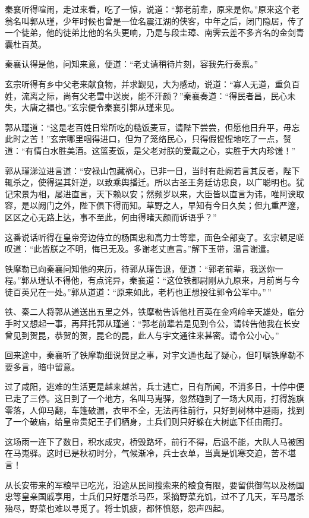 \documentclass[12pt,oneside]{book}
\begin{document}
秦襄听得喧闹，走过来看，吃了一惊，说道：``郭老前辈，原来是你。''原来这个老翁名叫郭从瑾，少年时候也曾是一位名震江湖的侠客，中年之后，闭门隐居，传了一个徒弟，他的徒弟比他的名头更响，乃是与段圭璋、南霁云差不多齐名的金剑青囊杜百英。

秦襄认得是他，问知来意，便道：``老丈请稍待片刻，容我先行奏禀。''

玄宗听得有乡中父老来献食物，并求觐见，大为感动，说道：``寡人无道，重负百姓，流离之际，尚有父老雪中送炭，能不汗颜？''秦襄奏道：``得民者昌，民心未失，大唐之福也。''玄宗便令秦襄引郭从瑾来见。

郭从瑾道：``这是老百姓日常所吃的糙饭麦豆，请陛下尝尝，但愿他日升平，毋忘此时之苦！''玄宗哪里咽得进口，但为了笼络民心，只得假惺惺地吃了一点，赞道：``有情白水胜美酒。这篮麦饭，是父老对朕的爱戴之心，实胜于大内珍馐！''

郭从瑾涕泣进言道：``安禄山包藏祸心，已非一日，当时有赴阙若言其反者，陛下辄杀之，使得逞其奸逆，以致乘舆播迁。所以古圣王务廷访忠良，以广聪明也。犹记宋景为相，屡进直言，天下赖以安；然频岁以来，大臣皆以直言为讳，唯阿谀取容，是以阙门之外，陛下俱下得而知。草野之人，早知有今日久矣；但九重严邃，区区之心无路上达，事不至此，何由得睹天颜而诉语乎？''

这番说话听得在皇帝旁边侍立的杨国忠和高力士等辈，面色全部变了。玄宗顿足嗟叹道：``此皆朕之不明，悔已无及。多谢老丈直言。''解下玉带，温言谢遣。

铁摩勒已向秦襄问知他的来历，待郭从瑾告退，便道：``郭老前辈，我送你一程。''郭从瑾认不得他，有点诧异，秦襄道：``这位铁都尉刚从九原来，月前尚与今徒百英兄在一处。''郭从道道：``原来如此，老朽也正想投往郭令公军中。''\,''

铁、秦二人将郭从道送出五里之外，铁摩勒告诉他杜百英在金鸡岭辛天雄处，临分手时又想起一事，再拜托郭从瑾道：``郭老前辈若是见到令公，请转告他我在长安曾见到贺昆，恭贺的贺，昆仑的昆，此人与宇文通往来甚密。请令公小心。''

回来途中，秦襄听了铁摩勒细说贺昆之事，对宇文通也起了疑心，但叮嘱铁摩勒不要多言，暗中留意。

过了咸阳，逃难的生活更是越来越苦，兵士逃亡，日有所闻，不消多日，十停中便已走了三停。这日到了一个地方，名叫马嵬驿，忽然碰到了一场大风雨，打得施旗零落，人仰马翻，车篷破漏，衣甲不全，无法再往前行，只好到树林中避雨，找到了一个破庙，给皇帝贵妃王子们栖身，土兵们则只好躲在大树底下任由雨打。

这场雨一连下了数日，积水成灾，桥毁路坏，前行不得，后退不能，大队人马被困在马嵬驿。这时已是秋初时分，气候渐冷，兵士衣单，当真是饥寒交迫，苦不堪言！

从长安带来的军粮早已吃光，沿途从民间搜索来的粮食有限，要留供御驾以及杨国忠等皇亲国戚享用，士兵们只好屠杀马匹，采摘野菜充饥，过不了几天，军马屠杀殆尽，野菜也难以寻觅了。将士饥疲，都怀愤怒，怨声四起。
\end{document}
